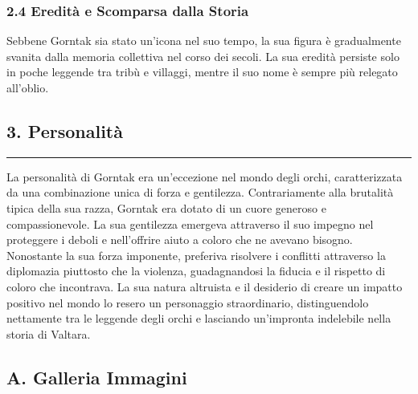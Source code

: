 \subsubsection{\texorpdfstring{2.4 \textbf{Eredità e Scomparsa dalla
Storia}}{2.4 Eredità e Scomparsa dalla Storia}}\label{eredituxe0-e-scomparsa-dalla-storia}

Sebbene Gorntak sia stato un'icona nel suo tempo, la sua figura è
gradualmente svanita dalla memoria collettiva nel corso dei secoli. La
sua eredità persiste solo in poche leggende tra tribù e villaggi, mentre
il suo nome è sempre più relegato all'oblio.

\subsection{3. Personalità}\label{personalituxe0}

\begin{center}\rule{0.5\linewidth}{0.5pt}\end{center}

La personalità di Gorntak era un'eccezione nel mondo degli orchi,
caratterizzata da una combinazione unica di forza e gentilezza.
Contrariamente alla brutalità tipica della sua razza, Gorntak era dotato
di un cuore generoso e compassionevole. La sua gentilezza emergeva
attraverso il suo impegno nel proteggere i deboli e nell'offrire aiuto a
coloro che ne avevano bisogno. Nonostante la sua forza imponente,
preferiva risolvere i conflitti attraverso la diplomazia piuttosto che
la violenza, guadagnandosi la fiducia e il rispetto di coloro che
incontrava. La sua natura altruista e il desiderio di creare un impatto
positivo nel mondo lo resero un personaggio straordinario,
distinguendolo nettamente tra le leggende degli orchi e lasciando
un'impronta indelebile nella storia di Valtara.

\subsection{A. Galleria Immagini}\label{a.-galleria-immagini}

